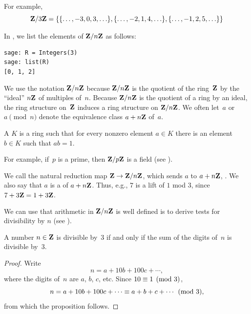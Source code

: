 \begin{example}
For example,
$$
  \mathbf{Z}/3\mathbf{Z}{} = \{ \{\ldots, -3, 0, 3, \ldots\},
              \{\ldots, -2, 1, 4, \ldots\},
              \{\ldots, -1, 2, 5, \ldots\}\}
$$
\begin{sg}
In \sage, we list the elements of $\mathbf{Z}/n\mathbf{Z}$ as follows:
\begin{verbatim}
sage: R = Integers(3)
sage: list(R)
[0, 1, 2]
\end{verbatim}
\end{sg}
\end{example}

\label{page:znring}
We use the notation $\mathbf{Z}/n\mathbf{Z}{}$ because $\mathbf{Z}/n\mathbf{Z}{}$ is the quotient of
the ring~$\mathbf{Z}$ by the ``ideal'' $n\mathbf{Z}$ of multiples of~$n$.  Because
$\mathbf{Z}/n\mathbf{Z}{}$ is the quotient of a ring by an ideal, the ring structure
on~$\mathbf{Z}$ induces a ring structure on $\mathbf{Z}/n\mathbf{Z}{}$.
We often let~$a$ or $a\pmod{n}$
denote the equivalence class $a+n\mathbf{Z}$ of~$a$.

\begin{definition}[Field]\label{defn:field}
A  $K$ is a ring such that for every
nonzero element $a\in K$ there is an element $b\in K$
such that $ab=1$.
\end{definition}

For example, if~$p$ is a prime, then $\mathbf{Z}/p\mathbf{Z}{}$ is a
field (see
).

\begin{definition}
  We call the natural reduction map $\mathbf{Z} \to \mathbf{Z}/n\mathbf{Z}{}$, which sends $a$
  to $a+n\mathbf{Z}$, .  We also say that $a$ is a
   of $a+n\mathbf{Z}$.  Thus, e.g., $7$ is a lift of $1$ mod $3$,
  since $7+3\mathbf{Z} = 1+3\mathbf{Z}$.
\end{definition}

We can use that arithmetic in $\mathbf{Z}/n\mathbf{Z}{}$ is well defined is to
derive tests for divisibility by $n$ (see
).
\begin{proposition}\label{prop:div3}
A number $n\in\mathbf{Z}$ is divisible by~$3$ if and only if
the sum of the digits of~$n$ is divisible by~$3$.
\end{proposition}
\begin{proof}
Write
 $$n=a+10b+100c+\cdots,$$
where the digits of~$n$ are $a$, $b$, $c$, etc.
Since $10\equiv 1\pmod{3}$,
$$
  n = a + 10b + 100c+\cdots \equiv a + b + c+\cdots \pmod{3},
$$
from which the proposition follows.
\end{proof}


